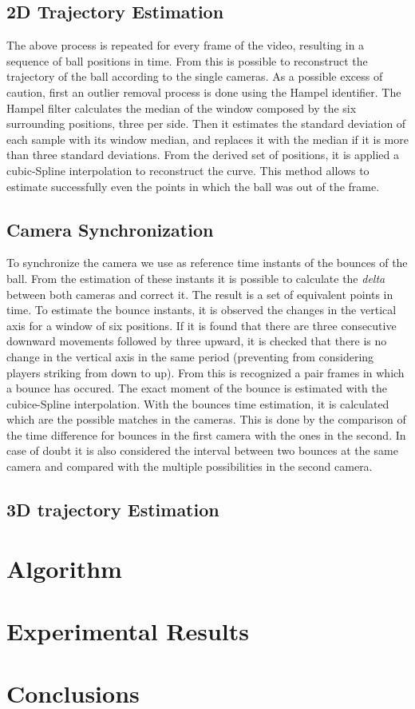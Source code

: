 \documentclass[a4paper]{article}
\begin{document}
\subsection{2D Trajectory Estimation}
The above process is repeated for every frame of the video, resulting in a sequence of ball positions in time. From this is possible to reconstruct the trajectory of the ball according to the single cameras. 
As a possible excess of caution, first an outlier removal process is done using the Hampel identifier. The Hampel filter calculates the median of the window composed by the six surrounding positions, three per side. Then it estimates the standard deviation of each sample with its window median, and replaces it with the median if it is more than three standard deviations. 
From the derived set of positions, it is applied a cubic-Spline interpolation to reconstruct the curve. This method allows to estimate successfully even the points in which the ball was out of the frame.  

\subsection{Camera Synchronization}
To synchronize the camera we use as reference time instants of the bounces of the ball. From the estimation of these instants it is possible to calculate the \textit{delta} between both cameras and correct it. The result is a set of equivalent points in time. 
To estimate the bounce instants, it is observed the changes in the vertical axis for a window of six positions. If it is found that there are three consecutive downward movements followed by three upward, it is checked that there is no change in the vertical axis in the same period (preventing from considering players striking from down to up). From this is recognized a pair frames in which a bounce has occured. The exact moment of the bounce is estimated with the cubice-Spline interpolation.
With the bounces time estimation, it is calculated which are the possible matches in the cameras. This is done by the comparison of the time difference for bounces in the first camera with the ones in the second. In case of doubt it is also considered the interval between two bounces at the same camera and compared with the multiple possibilities in the second camera.  

\subsection{3D trajectory Estimation}

\section{Algorithm}
\section{Experimental Results}
\section{Conclusions}
\end{document}
